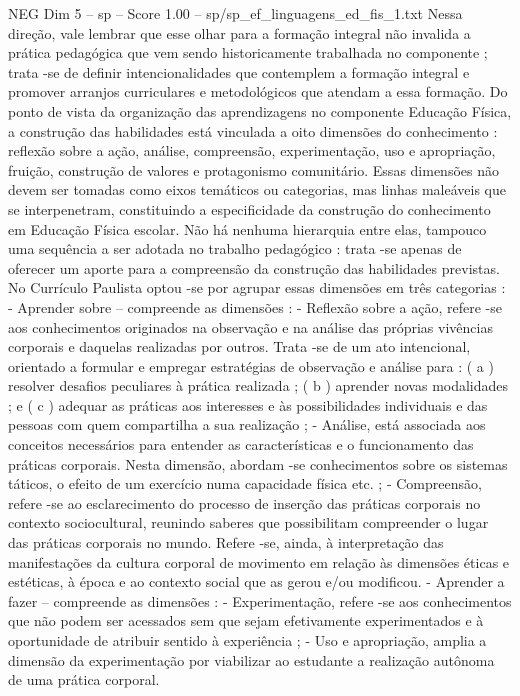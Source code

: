 \begin{textsample}{NEG Dim 5 – sp – Score 1.00 – sp/sp\_ef\_linguagens\_ed\_fis\_1.txt}
Nessa direção, vale lembrar que esse olhar para a formação integral não invalida a prática pedagógica que vem sendo historicamente trabalhada no componente ; trata -se de definir intencionalidades que contemplem a formação integral e promover arranjos curriculares e metodológicos que atendam a essa formação.
Do ponto de vista da organização das aprendizagens no componente Educação Física, a construção das habilidades está vinculada a oito dimensões do conhecimento : reflexão sobre a ação, análise, compreensão, experimentação, uso e apropriação, fruição, construção de valores e protagonismo comunitário.
Essas dimensões não devem ser tomadas como eixos temáticos ou categorias, mas linhas maleáveis que se interpenetram, constituindo a especificidade da construção do conhecimento em Educação Física escolar.
Não há nenhuma hierarquia entre elas, tampouco uma sequência a ser adotada no trabalho pedagógico : trata -se apenas de oferecer um aporte para a compreensão da construção das habilidades previstas.
No Currículo Paulista optou -se por agrupar essas dimensões em três categorias : - Aprender sobre – compreende as dimensões : - Reflexão sobre a ação, refere -se aos conhecimentos originados na observação e na análise das próprias vivências corporais e daquelas realizadas por outros.
Trata -se de um ato intencional, orientado a formular e empregar estratégias de observação e análise para : ( a ) resolver desafios peculiares à prática realizada ; ( b ) aprender novas modalidades ; e ( c ) adequar as práticas aos interesses e às possibilidades individuais e das pessoas com quem compartilha a sua realização ; - Análise, está associada aos conceitos necessários para entender as características e o funcionamento das práticas corporais.
Nesta dimensão, abordam -se conhecimentos sobre os sistemas táticos, o efeito de um exercício numa capacidade física etc. ; - Compreensão, refere -se ao esclarecimento do processo de inserção das práticas corporais no contexto sociocultural, reunindo saberes que possibilitam compreender o lugar das práticas corporais no mundo.
Refere -se, ainda, à interpretação das manifestações da cultura corporal de movimento em relação às dimensões éticas e estéticas, à época e ao contexto social que as gerou e/ou modificou. - Aprender a fazer – compreende as dimensões : - Experimentação, refere -se aos conhecimentos que não podem ser acessados sem que sejam efetivamente experimentados e à oportunidade de atribuir sentido à experiência ; - Uso e apropriação, amplia a dimensão da experimentação por viabilizar ao estudante a realização autônoma de uma prática corporal.

\end{textsample}
